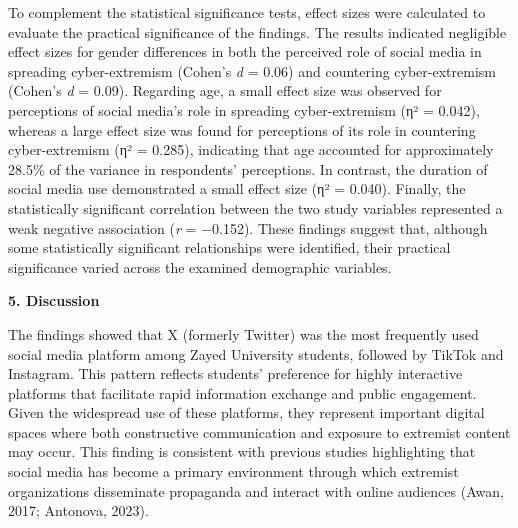 \documentclass[11pt,a4paper]{article}
\begin{document}
	To complement the statistical significance tests, effect sizes were calculated to evaluate the practical significance of the findings. The results indicated negligible effect sizes for gender differences in both the perceived role of social media in spreading cyber-extremism (Cohen's \textit{d} = 0.06) and countering cyber-extremism (Cohen's \textit{d} = 0.09). Regarding age, a small effect size was observed for perceptions of social media's role in spreading cyber-extremism (η² = 0.042), whereas a large effect size was found for perceptions of its role in countering cyber-extremism (η² = 0.285), indicating that age accounted for approximately 28.5\% of the variance in respondents' perceptions. In contrast, the duration of social media use demonstrated a small effect size (η² = 0.040). Finally, the statistically significant correlation between the two study variables represented a weak negative association (\textit{r} = −0.152). These findings suggest that, although some statistically significant relationships were identified, their practical significance varied across the examined demographic variables.
	
	\textbf{5. Discussion}
	
	The findings showed that X (formerly Twitter) was the most frequently used social media platform among Zayed University students, followed by TikTok and Instagram. This pattern reflects students' preference for highly interactive platforms that facilitate rapid information exchange and public engagement. Given the widespread use of these platforms, they represent important digital spaces where both constructive communication and exposure to extremist content may occur. This finding is consistent with previous studies highlighting that social media has become a primary environment through which extremist organizations disseminate propaganda and interact with online audiences (Awan, 2017; Antonova, 2023).
	
\end{document}

